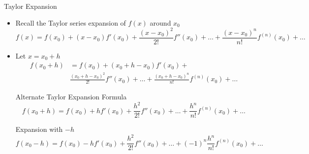 \documentclass[10pt]{beamer}
\begin{document}
\begin{frame}[shrink]{Taylor Expansion}

\begin{itemize}
    \item Recall the Taylor series expansion of $f(x)$ around $x_0$
    $$
        f(x) =  f(x_0) + (x-x_0) f'(x_0) + \frac{(x-x_0)^2}{2!} f''(x_0) + \dots + \frac{(x-x_0)^n}{n!} f^{(n)}(x_0)+\dots
    $$
    \item Let $x = x_0 + h$
    \begin{align*}    
    f(x_0 + h) &= f(x_0) + (x_0 + h -x_0) f'(x_0) + \\
                 &\frac{(x_0 + h -x_0)^2}{2!} f''(x_0) + \dots + \frac{(x_0 + h -x_0)^n}{n!} f^{(n)}(x_0)+\dots
    \end{align*}


    \begin{block}{Alternate Taylor Expansion Formula}
    $$
        f(x_0 + h) =  f(x_0) + h f'(x_0) + \frac{h^2}{2!} f''(x_0) + \dots + \frac{h^n}{n!} f^{(n)}(x_0)+\dots
    $$
    \end{block}
    \begin{block}{Expansion with $-h$}
    $$
        f(x_0 - h) =  f(x_0) - h f'(x_0) +\frac{h^2}{2!} f''(x_0) + \dots + (-1)^n\frac{h^n}{n!} f^{(n)}(x_0)+\dots
    $$
    \end{block}
\end{itemize}
\end{frame}
\end{document}
